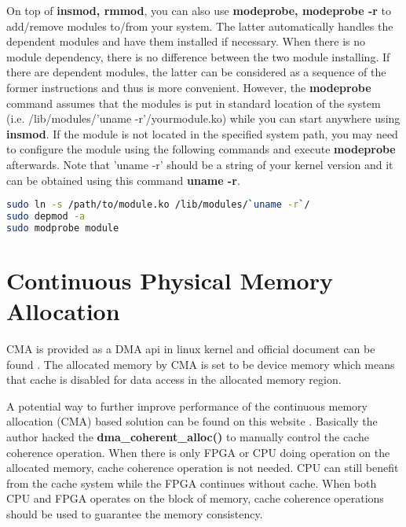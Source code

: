 \documentclass[12pt]{article} %
\begin{document}
On top of \textbf{insmod, rmmod}, you can also use \textbf{modeprobe, modeprobe -r} to add/remove modules to/from your system.
The latter automatically handles the dependent modules and have them installed if necessary. When there is no 
module dependency, there is no difference between the two module installing. If there are dependent modules, the latter can be 
considered as a sequence of the former instructions and thus is more convenient. However, the \textbf{modeprobe} command assumes 
that the modules is put in standard location of the system (i.e. /lib/modules/'uname -r'/yourmodule.ko) while you can start 
anywhere using \textbf{insmod}. If the module is not located in the specified system path, you may need to configure the module 
using the following commands and execute \textbf{modeprobe} afterwards. Note that 'uname -r' should be a string of your kernel version 
and it can be obtained using this command \textbf{uname -r}.

\begin{lstlisting}[language=bash]
sudo ln -s /path/to/module.ko /lib/modules/`uname -r`/
sudo depmod -a
sudo modprobe module
\end{lstlisting}

\section{Continuous Physical Memory Allocation}
CMA is provided as a DMA api in linux kernel and official document can be found \cite{dma-api, dma-api-howto}.
The allocated memory by CMA is set to be device memory which means that cache is disabled for data access 
in the allocated memory region.

A potential way to further improve performance of the continuous memory allocation (CMA) 
based solution can be found on this website \cite{cma-cache}. Basically the author hacked the 
\textbf{dma\_coherent\_alloc()} to manually control the cache coherence operation. When there is only 
FPGA or CPU doing operation on the allocated memory, cache coherence operation is not needed. CPU can still 
benefit from the cache system while the FPGA continues without cache. When 
both CPU and FPGA operates on the block of memory, cache coherence operations should be used to guarantee the 
memory consistency.
\end{document}
